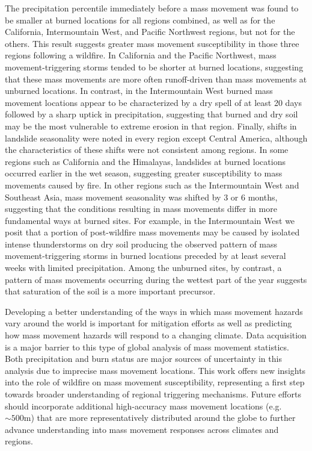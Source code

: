 \documentclass[nhess, manuscript]{copernicus}
\begin{document}
The precipitation percentile immediately before a mass movement was found to
be smaller at burned locations for all regions combined, as well as for
the California, Intermountain West, and Pacific Northwest regions, but
not for the others. This result suggests greater mass movement
susceptibility in those three regions following a wildfire. In
California and the Pacific Northwest, mass movement-triggering storms tended
to be shorter at burned locations, suggesting that these mass movements are
more often runoff-driven than mass movements at unburned locations. In
contrast, in the Intermountain West burned mass movement locations appear to be
characterized by a dry spell of at least 20 days followed by a sharp uptick in
precipitation, suggesting that burned and dry soil may be the most
vulnerable to extreme erosion in that region. Finally, shifts in
landslide seasonality were noted in every region except Central America,
although the characteristics of these shifts were not consistent among
regions. In some regions such as California and the Himalayas,
landslides at burned locations occurred earlier in the wet season,
suggesting greater susceptibility to mass movements caused by fire. In other
regions such as the Intermountain West and Southeast Asia, mass movement
seasonality was shifted by 3 or 6 months, suggesting that the conditions resulting in mass movements differ in more fundamental ways at burned sites. For example, in the Intermountain West we posit that a portion of post-wildfire
mass movements may be caused by isolated intense
thunderstorms on dry soil producing the observed pattern of mass movement-triggering storms in burned locations preceded by at least several weeks with limited precipitation. Among the unburned sites, by contrast, a pattern of mass movements occurring during the wettest part of the year suggests that saturation of the soil is a more important precursor.

Developing a better understanding of the ways in which mass movement hazards vary around the world is important for mitigation efforts as well as predicting how mass movement hazards will respond to a changing climate. Data acquisition is a major barrier to this type of global analysis of mass movement statistics. Both precipitation and burn status are major sources of uncertainty in this analysis due to imprecise mass movement locations. This work offers new insights into the role of wildfire on mass movement susceptibility, representing a first step towards broader understanding of regional triggering mechanisms. Future efforts should incorporate additional high-accuracy mass movement locations (e.g. \(\sim500\text{m}\)) that are more representatively distributed around the globe to further advance understanding into mass movement responses across climates and regions. 
\end{document}
